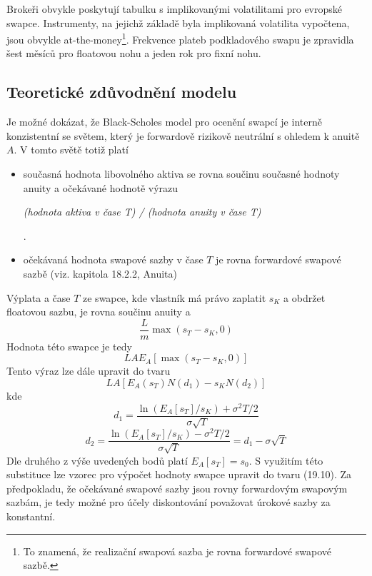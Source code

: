 \documentclass[a4paper]{book}
\begin{document}
Brokeři obvykle poskytují tabulku s implikovanými volatilitami pro evropské swapce. Instrumenty, na jejichž základě byla implikovaná volatilita vypočtena, jsou obvykle at-the-money\footnote{To znamená, že realizační swapová sazba je rovna forwardové swapové sazbě.}. Frekvence plateb podkladového swapu je zpravidla šest měsíců pro floatovou nohu a jeden rok pro fixní nohu.

\subsection{Teoretické zdůvodnění modelu}

Je možné dokázat, že Black-Scholes model pro ocenění swapcí je interně konzistentní se světem, který je forwardově rizikově neutrální s ohledem k anuitě $A$. V tomto světě totiž platí
\begin{itemize}
\item současná hodnota libovolného aktiva se rovna součinu současné hodnoty anuity a očekávané hodnotě výrazu
\begin{center}
\textit{(hodnota aktiva v čase T) / (hodnota anuity v čase T)}
\end{center}.
\item očekávaná hodnota swapové sazby v čase $T$ je rovna forwardové swapové sazbě (viz. kapitola 18.2.2, Anuita)
\end{itemize}
Výplata a čase $T$ ze swapce, kde vlastník má právo zaplatit $s_K$ a obdržet floatovou sazbu, je rovna součinu anuity a
\begin{equation*}
\frac{L}{m}\max(s_T - s_K, 0)
\end{equation*}
Hodnota této swapce je tedy
\begin{equation*}
LAE_A[\max(s_T - s_K, 0)]
\end{equation*}
Tento výraz lze dále upravit do tvaru
\begin{equation*}
LA[E_A(s_T)N(d_1) - s_KN(d_2)]
\end{equation*}
kde
\begin{equation*}
d_1 = \frac{\ln(E_A[s_T]/s_K)+\sigma^2T/2}{\sigma \sqrt{T}}
\end{equation*}
\begin{equation*}
d_2 = \frac{\ln(E_A[s_T]/s_K)-\sigma^2T/2}{\sigma \sqrt{T}} = d_1 - \sigma \sqrt{T}
\end{equation*}
Dle druhého z výše uvedených bodů platí $E_A[s_T] = s_0$. S využitím této substituce lze vzorec pro výpočet hodnoty swapce upravit do tvaru (19.10). Za předpokladu, že očekávané swapové sazby jsou rovny forwardovým swapovým sazbám, je tedy možné pro účely diskontování považovat úrokové sazby za konstantní.
\end{document}
